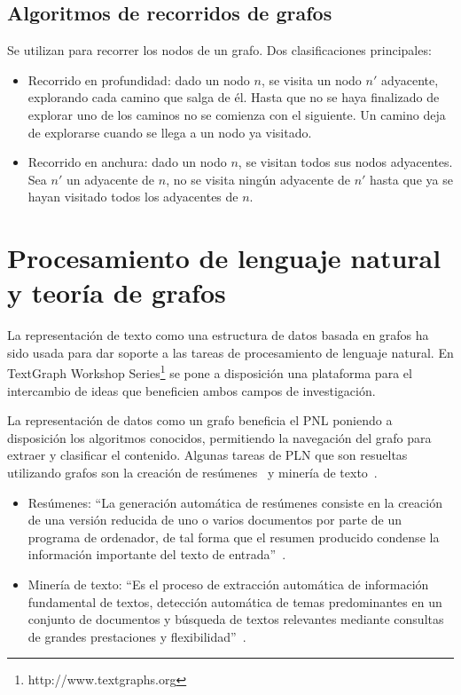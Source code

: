 \subsection{Algoritmos de recorridos de grafos}
Se utilizan para recorrer los nodos de un grafo. Dos clasificaciones principales:
\begin{itemize}
    \item Recorrido en profundidad: dado un nodo $n$, se visita un nodo $n'$ adyacente, explorando cada camino que salga de él. Hasta que no se haya finalizado de explorar uno de los caminos no se comienza con el siguiente. Un camino deja de explorarse cuando se llega a un nodo ya visitado. 
    \item Recorrido en anchura: dado un nodo $n$, se visitan todos sus nodos adyacentes. Sea $n'$ un adyacente de $n$, no se visita ningún adyacente de $n'$ hasta que ya se hayan visitado todos los adyacentes de $n$. 
\end{itemize}

\section{Procesamiento de lenguaje natural y teoría de grafos}
La representación de texto como una estructura de datos basada en grafos ha sido usada para dar soporte a las tareas de procesamiento de lenguaje natural. En TextGraph Workshop Series\footnote{http://www.textgraphs.org} se pone a disposición una plataforma para el intercambio de ideas que beneficien ambos campos de investigación. 

La representación de datos como un grafo beneficia el PNL poniendo a disposición los algoritmos conocidos, permitiendo la navegación del grafo para extraer y clasificar el contenido. Algunas tareas de PLN que son resueltas utilizando grafos son la creación de resúmenes~\cite{mihalcea2004graph}\cite{erkan2004lexrank} y minería de texto~\cite{Jin:2007:GTR:1244002.1244182}\cite{beliga2015overview}.

\begin{itemize}
    \item Resúmenes: ``La generación automática de resúmenes consiste en la creación de una versión reducida de uno o varios documentos por parte de un programa de ordenador, de tal forma que el resumen producido condense la información importante del texto de entrada''~\cite{plaza2011uso}.
    \item Minería de texto: ``Es el proceso de extracción automática de información fundamental de textos,  detección  automática  de temas  predominantes en un conjunto de documentos y búsqueda de textos relevantes mediante consultas de grandes prestaciones y flexibilidad''~\cite{brun2004articulo}.
\end{itemize}

